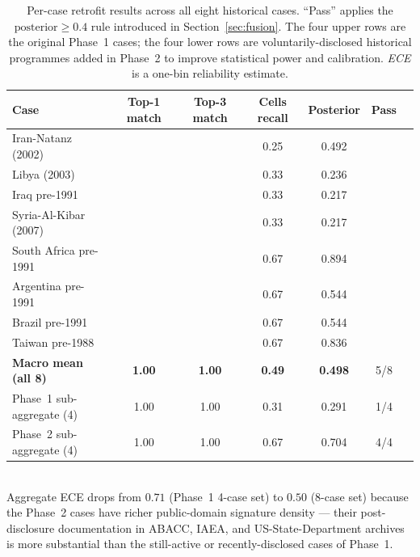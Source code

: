 \documentclass[11pt,a4paper]{article}
\newcommand{\cmark}{\ding{51}}
\newcommand{\xmark}{\ding{55}}
\begin{document}
\begin{table}[h]
  \centering
  \small
  \caption{Per-case retrofit results across all eight historical cases.
  ``Pass'' applies the $\text{posterior} \geq 0.4$ rule introduced in
  Section~\ref{sec:fusion}. The four upper rows are the original Phase~1
  cases; the four lower rows are voluntarily-disclosed historical
  programmes added in Phase~2 to improve statistical power and
  calibration. \emph{ECE} is a one-bin reliability estimate.}
  \label{tab:per_case}
  \begin{tabular}{lcccccc}
  \toprule
  Case & Top-1 match & Top-3 match & Cells recall & Posterior & Pass \\
  \midrule
  Iran-Natanz (2002)              & \cmark & \cmark & 0.25 & 0.492 & \cmark \\
  Libya (2003)                    & \cmark & \cmark & 0.33 & 0.236 & \xmark \\
  Iraq pre-1991                   & \cmark & \cmark & 0.33 & 0.217 & \xmark \\
  Syria-Al-Kibar (2007)           & \cmark & \cmark & 0.33 & 0.217 & \xmark \\
  \midrule
  South Africa pre-1991           & \cmark & \cmark & 0.67 & 0.894 & \cmark \\
  Argentina pre-1991              & \cmark & \cmark & 0.67 & 0.544 & \cmark \\
  Brazil pre-1991                 & \cmark & \cmark & 0.67 & 0.544 & \cmark \\
  Taiwan pre-1988                 & \cmark & \cmark & 0.67 & 0.836 & \cmark \\
  \midrule
  \textbf{Macro mean (all 8)}     & \textbf{1.00} & \textbf{1.00} & \textbf{0.49} & \textbf{0.498} & 5/8 \\
  Phase~1 sub-aggregate (4)       & 1.00 & 1.00 & 0.31 & 0.291 & 1/4 \\
  Phase~2 sub-aggregate (4)       & 1.00 & 1.00 & 0.67 & 0.704 & 4/4 \\
  \bottomrule
  \end{tabular}
  \\[2pt]\footnotesize
  Aggregate ECE drops from $0.71$ (Phase~1 4-case set) to $0.50$
  (8-case set) because the Phase~2 cases have richer public-domain
  signature density --- their post-disclosure documentation in
  ABACC, IAEA, and US-State-Department archives is more substantial
  than the still-active or recently-disclosed cases of Phase~1.
\end{table}
\end{document}
